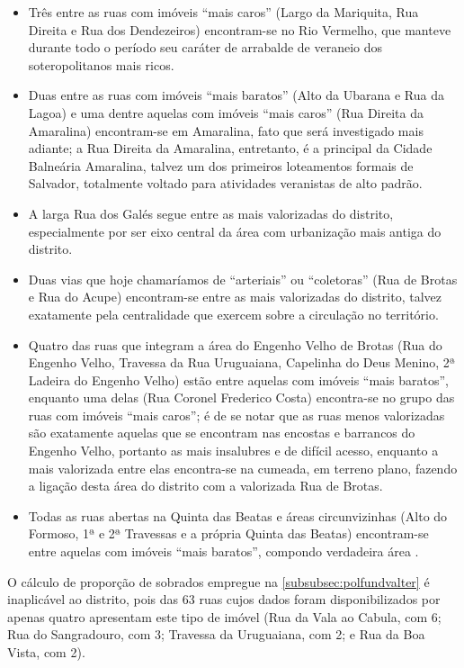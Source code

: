 


\begin{itemize}
\item Três entre as ruas com imóveis ``mais caros'' (Largo da Mariquita, Rua Direita e Rua dos Dendezeiros) encontram-se no Rio Vermelho, que manteve durante todo o período seu caráter de arrabalde de veraneio dos soteropolitanos mais ricos. 
\item Duas entre as ruas com imóveis ``mais baratos'' (Alto da Ubarana e Rua da Lagoa) e uma dentre aquelas com imóveis ``mais caros'' (Rua Direita da Amaralina) encontram-se em Amaralina, fato que será investigado mais adiante; a Rua Direita da Amaralina, entretanto, é a principal da Cidade Balneária Amaralina, talvez um dos primeiros loteamentos formais de Salvador, totalmente voltado para atividades veranistas de alto padrão.
\item A larga Rua dos Galés segue entre as mais valorizadas do distrito, especialmente por ser eixo central da área com urbanização mais antiga do distrito.
\item Duas vias que hoje chamaríamos de ``arteriais'' ou ``coletoras'' (Rua de Brotas e Rua do Acupe) encontram-se entre as mais valorizadas do distrito, talvez exatamente pela centralidade que exercem sobre a circulação no território.
\item Quatro das ruas que integram a área do Engenho Velho de Brotas (Rua do Engenho Velho, Travessa da Rua Uruguaiana, Capelinha do Deus Menino, 2ª Ladeira do Engenho Velho) estão entre aquelas com imóveis ``mais baratos'', enquanto uma delas (Rua Coronel Frederico Costa) encontra-se no grupo das ruas com imóveis ``mais caros''; é de se notar que as ruas menos valorizadas são exatamente aquelas que se encontram nas encostas e barrancos do Engenho Velho, portanto as mais insalubres e de difícil acesso, enquanto a mais valorizada entre elas encontra-se na cumeada, em terreno plano, fazendo a ligação desta área do distrito com a valorizada Rua de Brotas.
\item Todas as ruas abertas na Quinta das Beatas e áreas circunvizinhas (Alto do Formoso, 1ª e 2ª Travessas e a própria Quinta das Beatas) encontram-se entre aquelas com imóveis ``mais baratos'', compondo verdadeira área .
\end{itemize}

O cálculo de proporção de sobrados empregue na \autoref{subsubsec:polfundvalter} é inaplicável ao distrito, pois das 63 ruas cujos dados foram disponibilizados por  apenas quatro apresentam este tipo de imóvel (Rua da Vala ao Cabula, com 6; Rua do Sangradouro, com 3; Travessa da Uruguaiana, com 2; e Rua da Boa Vista, com 2).

